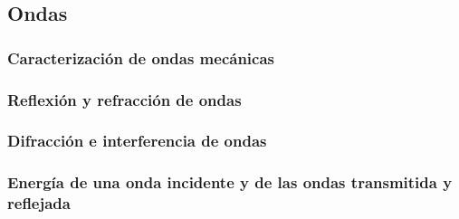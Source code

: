 \subsection{Ondas}
\subsubsection{Caracterización de ondas mecánicas}
\subsubsection{Reflexión y refracción de ondas}
\subsubsection{Difracción e interferencia de ondas}
\subsubsection{Energía de una onda incidente y de las ondas transmitida y reflejada}
